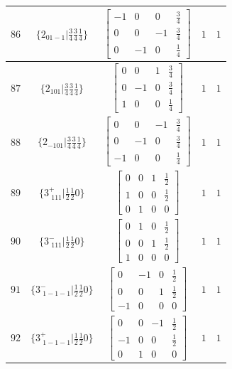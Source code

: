 \documentclass[fleqn,8pt]{jsarticle}
\begin{document}
\begin{longtable}{ccccc}
$ 86 $ & $ \{2{}_{01-1}|\frac{3}{4} \frac{3}{4} \frac{1}{4}\} $ & $ \begin{bmatrix} -1 & 0 & 0 & \frac{3}{4} \\ 0 & 0 & -1 & \frac{3}{4} \\ 0 & -1 & 0 & \frac{1}{4} \end{bmatrix} $ & $ 1 $ & $ 1 $ \\ \hline
$ 87 $ & $ \{2{}_{101}|\frac{3}{4} \frac{3}{4} \frac{1}{4}\} $ & $ \begin{bmatrix} 0 & 0 & 1 & \frac{3}{4} \\ 0 & -1 & 0 & \frac{3}{4} \\ 1 & 0 & 0 & \frac{1}{4} \end{bmatrix} $ & $ 1 $ & $ 1 $ \\ \hline
$ 88 $ & $ \{2{}_{-101}|\frac{3}{4} \frac{3}{4} \frac{1}{4}\} $ & $ \begin{bmatrix} 0 & 0 & -1 & \frac{3}{4} \\ 0 & -1 & 0 & \frac{3}{4} \\ -1 & 0 & 0 & \frac{1}{4} \end{bmatrix} $ & $ 1 $ & $ 1 $ \\ \hline
$ 89 $ & $ \{3^{+}_{\,\,111}|\frac{1}{2} \frac{1}{2} 0\} $ & $ \begin{bmatrix} 0 & 0 & 1 & \frac{1}{2} \\ 1 & 0 & 0 & \frac{1}{2} \\ 0 & 1 & 0 & 0 \end{bmatrix} $ & $ 1 $ & $ 1 $ \\ \hline
$ 90 $ & $ \{3^{-}_{\,\,111}|\frac{1}{2} \frac{1}{2} 0\} $ & $ \begin{bmatrix} 0 & 1 & 0 & \frac{1}{2} \\ 0 & 0 & 1 & \frac{1}{2} \\ 1 & 0 & 0 & 0 \end{bmatrix} $ & $ 1 $ & $ 1 $ \\ \hline
$ 91 $ & $ \{3^{-}_{\,\,1-1-1}|\frac{1}{2} \frac{1}{2} 0\} $ & $ \begin{bmatrix} 0 & -1 & 0 & \frac{1}{2} \\ 0 & 0 & 1 & \frac{1}{2} \\ -1 & 0 & 0 & 0 \end{bmatrix} $ & $ 1 $ & $ 1 $ \\ \hline
$ 92 $ & $ \{3^{+}_{\,\,1-1-1}|\frac{1}{2} \frac{1}{2} 0\} $ & $ \begin{bmatrix} 0 & 0 & -1 & \frac{1}{2} \\ -1 & 0 & 0 & \frac{1}{2} \\ 0 & 1 & 0 & 0 \end{bmatrix} $ & $ 1 $ & $ 1 $ \\ \hline

\end{longtable}
\end{document}
